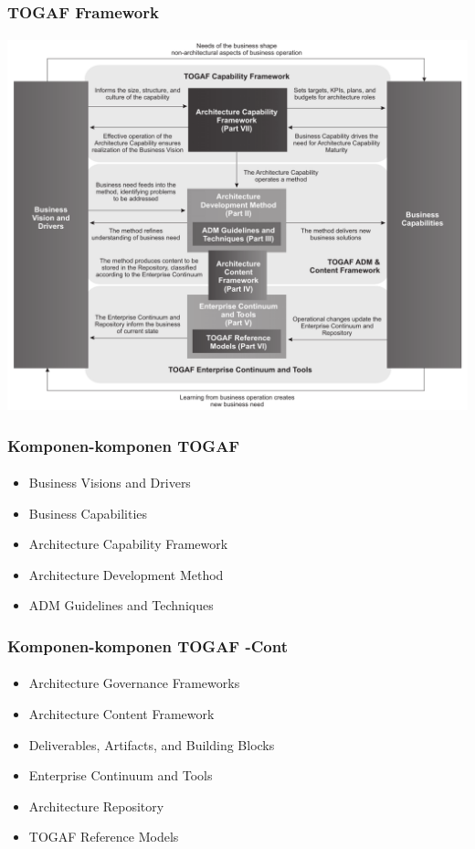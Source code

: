 \documentclass[aspectratio=169, table]{beamer}
\begin{document}
	{
		\begin{frame}
			\frametitle{TOGAF Framework}
			\framesubtitle{\hspace{1cm}}
			\begin{center}
				\includegraphics[width=.70\textwidth]{../figures/togaf}
			\end{center}
		\end{frame}
	}
	
	\begin{frame}
		\frametitle{Komponen-komponen TOGAF}
		\framesubtitle{\hspace{1cm}}
		\begin{itemize}
			\item Business Visions and Drivers
			\item Business Capabilities
			\item Architecture Capability Framework
			\item Architecture Development Method
			\item ADM Guidelines and Techniques
		\end{itemize}
	\end{frame}
	
	\begin{frame}
		\frametitle{Komponen-komponen TOGAF -Cont}
		\framesubtitle{\hspace{1cm}}
		\begin{itemize}
			
			\item Architecture Governance Frameworks
			\item Architecture Content Framework
			\item Deliverables, Artifacts, and Building Blocks
			\item Enterprise Continuum and Tools
			\item Architecture Repository
			\item TOGAF Reference Models
		\end{itemize}
	\end{frame}
	
\end{document}
